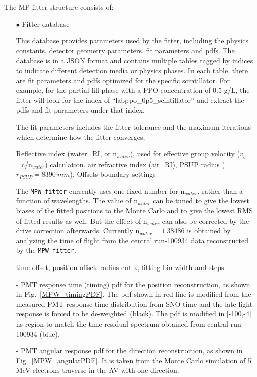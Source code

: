 The MP fitter structure consists of: 
\begin{itemize}
	\item[$\bullet$] Fitter database
	
	This database provides parameters used by the fitter, including the physics constants, detector geometry parameters, fit parameters and pdfs. The database is in a JSON format\cite{JSONwiki} and contains multiple tables tagged by indices to indicate different detection media or physics phases. In each table, there are fit parameters and pdfs optimized for the specific scintillator. For example, for the partial-fill phase with a PPO concentration of 0.5 g/L, the fitter will look for the index of ``labppo\_0p5\_scintillator'' and extract the pdfs and fit parameters under that index.  
	
	The fit parameters includes the fitter tolerance and the maximum iterations which determine how the fitter converges, 
	
	Reflective index (water\_RI, or n$_{water}$), used for effective group velocity ($v_g$ =c/n$_{water}$) calculation. 
	air refractive index (air\_RI), PSUP radius ($r_{PSUP}=8390~mm$). Offsets
	boundary settings
	
	The \texttt{MPW fitter} currently uses one fixed number for n$_{water}$, rather than a function of wavelengths. The value of n$_{water}$ can be tuned to give the lowest biases of the fitted positions to the Monte Carlo and to give the lowest RMS of fitted results as well. But the effect of n$_{water}$ can also be corrected by the drive correction afterwards. Currently n$_{water}=1.38486$ is obtained by analyzing the time of flight from the  central run-100934 data reconstructed by the \texttt{MPW fitter}. 
	
	time offset, position offset, radius cut x, fitting bin-width and steps.
	
	- PMT response time (timing) pdf for the position reconstruction, as shown in Fig.~\ref{MPW_timingPDF}. The pdf shown in red line is modified from the measured PMT response time distribution from SNO time and the late light response is forced to be de-weighted (black). The pdf is modified in [-100,-4] ns region to match the time residual spectrum obtained from  central run-100934 (blue).
	
	- PMT angular response pdf for the direction reconstruction, as shown in Fig.~\ref{MPW_angularPDF}. It is taken from the Monte Carlo simulation of 5 MeV electrons traverse in the AV with one direction.
	

\end{itemize}
